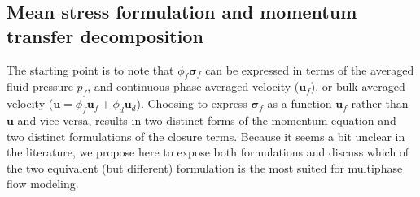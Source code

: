 \subsection{Mean stress formulation and momentum transfer decomposition}


The starting point is to note that $\phi_f\bm\sigma_f$ can be expressed in terms of the averaged fluid pressure $p_f$, and continuous phase averaged velocity ($\textbf{u}_f$), or bulk-averaged velocity ($\textbf{u} = \phi_f \textbf{u}_f + \phi_d \textbf{u}_d$).
Choosing to express $\bm\sigma_f$ as a function $\textbf{u}_f$ rather than $\textbf{u}$ and vice versa, results in two distinct forms of the momentum equation and two distinct formulations of the closure terms. 
Because it seems a bit unclear in the literature, we propose here to expose both formulations and discuss which of the two equivalent (but different) formulation is the most suited for multiphase flow modeling. 


